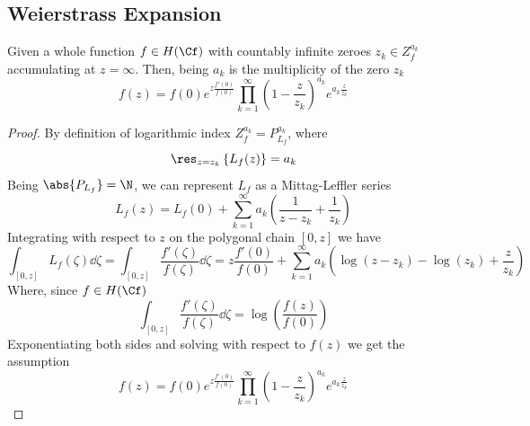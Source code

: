 \documentclass[../mmf.tex]{subfiles}
\begin{document}
\subsection{Weierstrass Expansion}
\begin{thm}
Given a whole function $f\in H(\Cf)$ with countably infinite zeroes $z_k\in Z_f^{a_k}$ accumulating at $z=\infty$. Then, being $a_k$ is the multiplicity of the zero $z_k$
	\begin{equation}
		f(z)=f(0)e^{z\frac{f'(0)}{f(0)}}\prod_{k=1}^{\infty}\left( 1-\frac{z}{z_k} \right)^{a_k}e^{a_k\frac{z}{z_k}}
		\label{eq:weierstrassexp}
	\end{equation}
\end{thm}
\begin{proof}
	By definition of logarithmic index $Z_f^{a_k}=P^{a_k}_{L_f}$, where
	\begin{equation*}
		\res_{z=z_k}\left\{ L_{f}(z) \right\}=a_k
	\end{equation*}
	Being $\abs{P_{L_f}}=\N$, we can represent $L_{f}$ as a Mittag-Leffler series
	\begin{equation*}
		L_{f}(z)=L_{f}(0)+\sum_{k=1}^{\infty}a_k\left( \frac{1}{z-z_k}+\frac{1}{z_k} \right)
	\end{equation*}
	Integrating with respect to $z$ on the polygonal chain $[0, z]$ we have
	\begin{equation*}
		\int_{[0, z]}L_{f}(\zeta)\dd\zeta=\int_{[0, z]}\frac{f'(\zeta)}{f(\zeta)}\dd\zeta=z\frac{f'(0)}{f(0)}+\sum_{k=1}^{\infty}a_k\left( \log\left( z-z_k \right)-\log\left( z_k \right)+\frac{z}{z_k} \right)
	\end{equation*}
	Where, since $f\in H(\Cf)$
	\begin{equation*}
		\int_{[0, z]}\frac{f'(\zeta)}{f(\zeta)}\dd\zeta=\log\left( \frac{f(z)}{f(0)} \right)
	\end{equation*}
	Exponentiating both sides and solving with respect to $f(z)$ we get the assumption
	\begin{equation*}
		f(z)=f(0)e^{z\frac{f'(0)}{f(0)}}\prod_{k=1}^{\infty}\left( 1-\frac{z}{z_k} \right)^{a_k}e^{a_k\frac{z}{z_k}}
	\end{equation*}
\end{proof}
\end{document}
